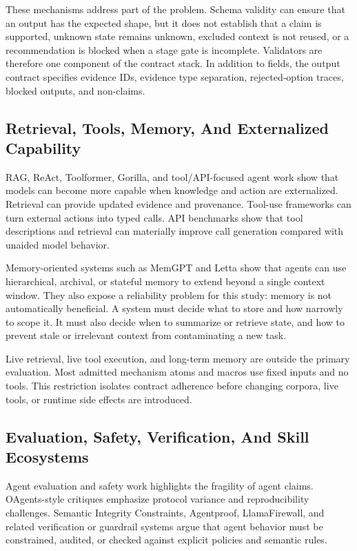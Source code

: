 \documentclass[11pt]{article}
\begin{document}
These mechanisms address part of the problem. Schema validity can ensure that an output has the expected shape, but it does not establish that a claim is supported, unknown state remains unknown, excluded context is not reused, or a recommendation is blocked when a stage gate is incomplete. Validators are therefore one component of the contract stack. In addition to fields, the output contract specifies evidence IDs, evidence type separation, rejected-option traces, blocked outputs, and non-claims.

\subsection{Retrieval, Tools, Memory, And Externalized Capability}

RAG, ReAct, Toolformer, Gorilla, and tool/API-focused agent work show that models can become more capable when knowledge and action are externalized. Retrieval can provide updated evidence and provenance. Tool-use frameworks can turn external actions into typed calls. API benchmarks show that tool descriptions and retrieval can materially improve call generation compared with unaided model behavior. \cite{P2_EXT_RAG,P2_EXT_REACT,P2_EXT_TOOLFORMER,P2_EXT_GORILLA}

Memory-oriented systems such as MemGPT and Letta show that agents can use hierarchical, archival, or stateful memory to extend beyond a single context window. They also expose a reliability problem for this study: memory is not automatically beneficial. A system must decide what to store and how narrowly to scope it. It must also decide when to summarize or retrieve state, and how to prevent stale or irrelevant context from contaminating a new task. \cite{P2_EXT_MEMGPT,P2_EXT_LETTA}

Live retrieval, live tool execution, and long-term memory are outside the primary evaluation. Most admitted mechanism atoms and macros use fixed inputs and no tools. This restriction isolates contract adherence before changing corpora, live tools, or runtime side effects are introduced.

\subsection{Evaluation, Safety, Verification, And Skill Ecosystems}

Agent evaluation and safety work highlights the fragility of agent claims. OAgents-style critiques emphasize protocol variance and reproducibility challenges. Semantic Integrity Constraints, Agentproof, LlamaFirewall, and related verification or guardrail systems argue that agent behavior must be constrained, audited, or checked against explicit policies and semantic rules. \cite{P2_EXT_OAGENTS,P2_EXT_SIC,P2_EXT_AGENTPROOF,P2_EXT_LLAMAFIREWALL}
\end{document}
